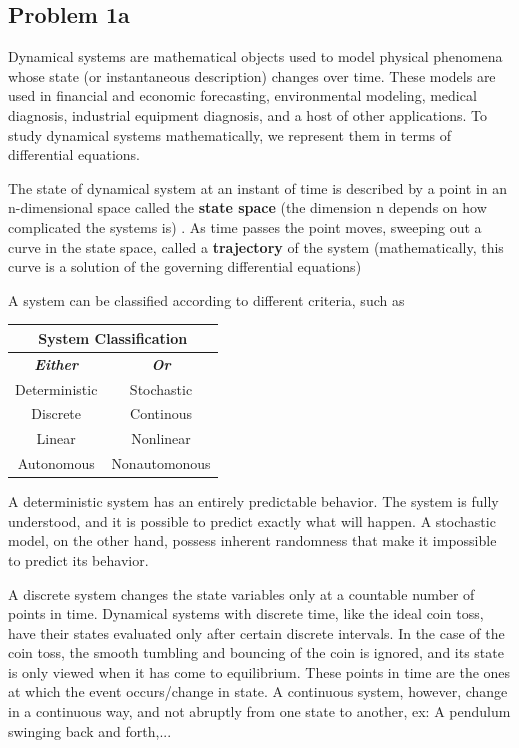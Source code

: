 	\subsection{Problem 1a}
	
	\bigskip
 Dynamical systems are mathematical objects used to model physical phenomena whose state (or instantaneous description) changes over time. These models are used in financial and economic forecasting, environmental modeling, medical diagnosis, industrial equipment diagnosis, and a host of other applications.
    To study dynamical systems mathematically, we represent them in terms of differential equations.
    
    The state of dynamical system at an instant of time is described by a point in an n-dimensional space called the \textbf{state space} (the dimension n depends on how complicated the systems is) . As time passes the point moves, sweeping out a curve in the state space, called a \textbf{trajectory} of the system (mathematically, this curve is a solution of the governing differential equations)
   
    A system can be classified according to different criteria, such as
    
    \bigskip
\begin{table}[h]
\centering
\begin{tabular}{|c|c|}
\hline
\multicolumn{2}{|c|}{System Classification}     \\ \hline
\textit{\textbf{Either}} & \textit{\textbf{Or}} \\ \hline
Deterministic            & Stochastic           \\ \hline
Discrete                 & Continous            \\ \hline
Linear                   & Nonlinear            \\ \hline
Autonomous               & Nonautomonous        \\ \hline
\end{tabular}%

\end{table}
\bigskip
\bigskip
    
A deterministic system has an entirely predictable behavior. The system is fully understood, and it is possible to predict exactly what will happen. A stochastic model, on the other hand, possess inherent randomness that make it impossible to predict its behavior. 

A discrete system changes the state variables only at a countable number of points in time. Dynamical systems with discrete time, like the ideal coin toss, have their states evaluated only after certain discrete intervals. In the case of the coin toss, the smooth tumbling and bouncing of the coin is ignored, and its state is only viewed when it has come to equilibrium. These points in time are the ones at which the event occurs/change in state. A continuous system, however, change in a continuous way, and not abruptly from one state to another, ex: A pendulum swinging back and forth,...


